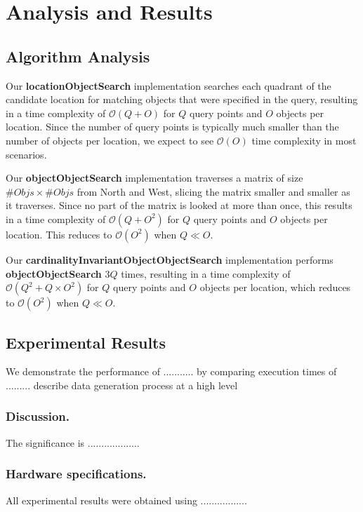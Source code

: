 \section{Analysis and Results}
\label{section:results}

\subsection{Algorithm Analysis}

Our \textbf{locationObjectSearch} implementation searches each quadrant of the candidate location for matching objects that were specified in the query, resulting in a time complexity of $\mathcal{O}(Q + O)$ for $Q$ query points and $O$ objects per location. 
Since the number of query points is typically much smaller than the number of objects per location, we expect to see $\mathcal{O}(O)$ time complexity in most scenarios.

Our \textbf{objectObjectSearch} implementation traverses a matrix of size $\# Objs \times \# Objs$ from North and West, slicing the matrix smaller and smaller as it traverses. 
Since no part of the matrix is looked at more than once, this results in a time complexity of $\mathcal{O}(Q + O^2)$ for $Q$ query points and $O$ objects per location. 
This reduces to $\mathcal{O}(O^2)$ when $Q \ll O$. %

Our \textbf{cardinalityInvariantObjectObjectSearch} implementation performs \textbf{objectObjectSearch} $3Q$ times, resulting in a time complexity of $\mathcal{O}(Q^2 + Q\times O^2)$ for $Q$ query points and $O$ objects per location, which reduces to $\mathcal{O}(O^2)$ when $Q \ll O$. 


\subsection{Experimental Results}
We demonstrate the performance of ........... by comparing execution times of ......... describe data generation process at a high level

\subsubsection{Discussion.} 
The significance is ...................

\subsubsection{Hardware specifications.} 
All experimental results were obtained using .................

